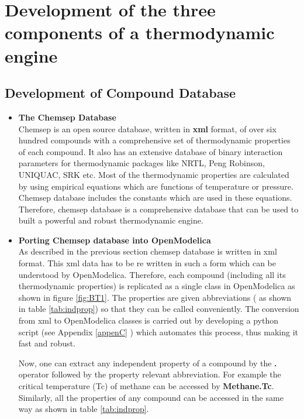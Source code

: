 \documentclass[12pt]{report}
\begin{document}
\section{Development of the three components of a thermodynamic engine}
\subsection{Development of Compound Database}
\begin{itemize}
\item {\textbf{The Chemsep Database}} \\
Chemsep is an open source database, written in \textbf{xml} format, of over six hundred compounds with a comprehensive set of thermodynamic properties of each compound. It also has an extensive database of binary interaction parameters for thermodynamic packages like NRTL, Peng Robinson, UNIQUAC, SRK etc. Most of the thermodynamic properties are calculated by using empirical equations which are functions of temperature or pressure. Chemsep database includes the constants which are used in these equations. Therefore, chemsep database is a comprehensive database that can be used to built a powerful and robust thermodynamic engine.

\item{\textbf{Porting Chemsep database into OpenModelica}} \\
As described in the previous section chemsep database is written in xml format. This xml data has to be re written in such a form which can be understood by OpenModelica. Therefore, each compound (including all its thermodynamic properties) is replicated as a single class in OpenModelica as shown in figure \ref{fig:BT1}. The properties are given abbreviations ( as shown in table \ref{tab:indprop}) so that they can be called conveniently. The conversion from xml to OpenModelica classes is carried out by developing a python script (see Appendix \ref{appenC} ) which automates this process, thus making it fast and robust. 

Now, one can extract any independent property of a compound by the \textbf{.} operator followed by the property relevant abbreviation. For example the critical temperature (Tc) of methane can be accessed by \textbf{Methane.Tc}. Similarly, all the properties of any compound can be accessed in the same way as shown in table \ref{tab:indprop}. \\
\end{itemize}
\end{document}

